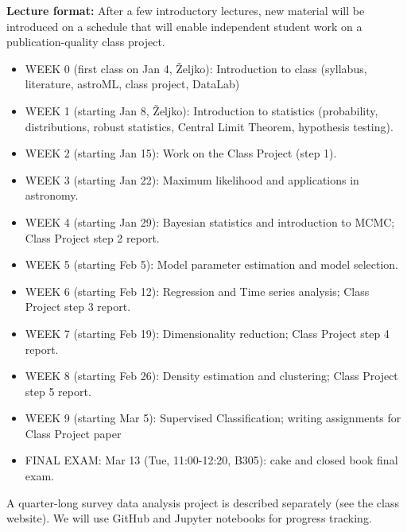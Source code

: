 \documentclass[10pt]{article}
\begin{document}
\vskip 0.2in
{\bf Lecture format:}
After a few introductory lectures, new material will be introduced on a schedule that 
will enable independent student work on a publication-quality class project. 

\newpage 
\begin{itemize}

\item WEEK 0 (first class on Jan 4, \v{Zeljko}): Introduction to class (syllabus, literature, astroML, class project, DataLab) 

\item WEEK 1 (starting Jan 8, \v{Zeljko}): Introduction to statistics (probability, distributions, 
                              robust statistics, Central Limit Theorem, hypothesis testing).

\item WEEK  2 (starting Jan 15): Work on the Class Project  (step 1). 

\item WEEK  3 (starting Jan 22): Maximum likelihood and applications in astronomy.

\item WEEK  4 (starting Jan 29): Bayesian statistics and introduction to MCMC; Class Project step 2 report.

\item WEEK  5 (starting Feb 5): Model parameter estimation and model selection.

\item WEEK  6 (starting Feb 12): Regression and Time series analysis; Class Project step 3 report. 

\item WEEK  7 (starting Feb 19): Dimensionality reduction; Class Project step 4 report. 

\item WEEK  8 (starting Feb 26): Density estimation and clustering; Class Project step 5 report. 

\item WEEK  9 (starting Mar 5): Supervised Classification; writing assignments for Class Project paper 

\item FINAL EXAM: Mar 13 (Tue, 11:00-12:20, B305): cake and closed book final exam.

\end{itemize}

\vskip 0.2in


A quarter-long survey data analysis project is described separately (see the class website). 
We will use GitHub and Jupyter notebooks for progress tracking. 
\end{document}
